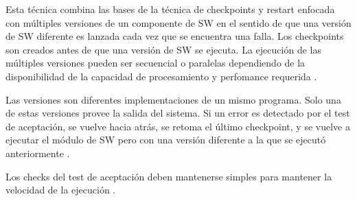 Esta técnica combina las bases de la técnica de checkpoints y restart enfocada con múltiples 
versiones de un componente de \ac{SW} en el sentido de que una versión de \ac{SW} diferente es 
lanzada cada vez que se encuentra una falla. Los 
checkpoints son creados antes de que una versión de \ac{SW} se ejecuta.
La ejecución de las múltiples versiones pueden ser 
secuencial o paralelas dependiendo de la disponibilidad de la capacidad de procesamiento y 
perfomance requerida \citep{SoftwareFaultToleranceATutorial}.

Las 
versiones son diferentes implementaciones de un mismo programa. Solo una de estas versiones provee 
la salida del sistema. Si un error es detectado por el test de aceptación, se vuelve hacia atrás, 
se retoma el último checkpoint, y se vuelve a ejecutar el módulo de \ac{SW} pero con una 
versión diferente a la que se ejecutó anteriormente \citep{FTDesign}.  	

Los checks del test de aceptación deben mantenerse simples para mantener la velocidad de la 
ejecución \citep{FTDesign}.


